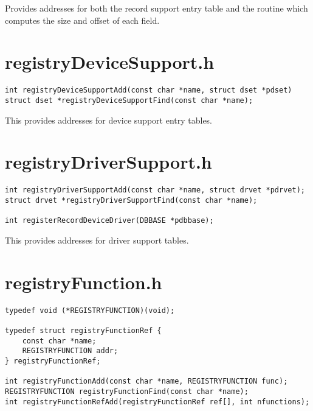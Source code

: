 Provides addresses for both the record support entry table and the routine which computes the size and offset of each 
field.

\section{registryDeviceSupport.h}

\begin{verbatim}
int registryDeviceSupportAdd(const char *name, struct dset *pdset)
struct dset *registryDeviceSupportFind(const char *name);
\end{verbatim}

This provides addresses for device support entry tables.

\section{registryDriverSupport.h}

\begin{verbatim}
int registryDriverSupportAdd(const char *name, struct drvet *pdrvet);
struct drvet *registryDriverSupportFind(const char *name);

int registerRecordDeviceDriver(DBBASE *pdbbase);
\end{verbatim}

This provides addresses for driver support tables.

\section{registryFunction.h}

\begin{verbatim}
typedef void (*REGISTRYFUNCTION)(void);

typedef struct registryFunctionRef {
    const char *name;
    REGISTRYFUNCTION addr;
} registryFunctionRef;

int registryFunctionAdd(const char *name, REGISTRYFUNCTION func);
REGISTRYFUNCTION registryFunctionFind(const char *name);
int registryFunctionRefAdd(registryFunctionRef ref[], int nfunctions);
\end{verbatim}

